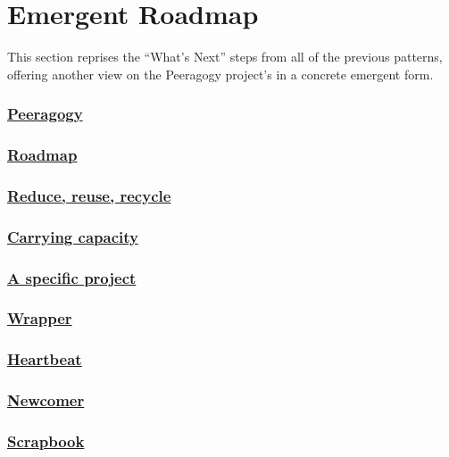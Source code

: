 \section{Emergent Roadmap} \label{sec:Distributed_Roadmap}

This section reprises the ``What's Next'' steps from all of the previous
patterns, offering another view on the Peeragogy project's
 in a concrete emergent form.

\subsubsection*{\hyperref[sec:Peeragogy]{Peeragogy}} 
\PeeragogyWN

\subsubsection*{\hyperref[sec:Roadmap]{Roadmap}} 
\RoadmapWN

\subsubsection*{\hyperref[sec:Reduce, reuse, recycle]{Reduce, reuse, recycle}}
\ReduceWN

\subsubsection*{\hyperref[sec:Carrying capacity]{Carrying capacity}} 
\CarryingWN

\subsubsection*{\hyperref[sec:A specific project]{A specific project}}
\SpecificWN

\subsubsection*{\hyperref[sec:Wrapper]{Wrapper}}
\WrapperWN

\subsubsection*{\hyperref[sec:Heartbeat]{Heartbeat}}
\HeartbeatWN

\subsubsection*{\hyperref[sec:Newcomer]{Newcomer}}
\NewcomerWN

\subsubsection*{\hyperref[sec:Scrapbook]{Scrapbook}} 



